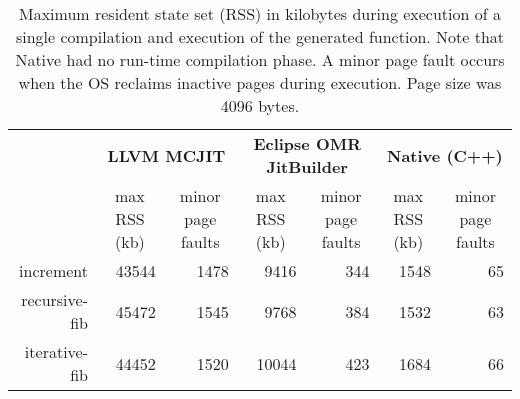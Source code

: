 \begin{table*}[t]
  \begin{tabular}{|r|l|l|l|l|l|l|}
  \hline
  
  \multicolumn{1}{|l|}{\multirow{2}{*}{}} 
  & \multicolumn{2}{c|}{\textbf{LLVM MCJIT}}                                                                                    
  & \multicolumn{2}{c|}{\textbf{Eclipse OMR JitBuilder}}                                                                
  & \multicolumn{2}{c|}{\textbf{Native (C++)}}                                                                              
  \\ \cline{2-7}
  
  \multicolumn{1}{|c|}{\textbf{Program}}  
  & \multicolumn{1}{c|}{max RSS (kb)}  %
  & \multicolumn{1}{c|}{minor page faults}  
  & \multicolumn{1}{c|}{max RSS (kb)}  %
  & \multicolumn{1}{c|}{minor page faults}  
  & \multicolumn{1}{c|}{max RSS (kb)}  %
  & \multicolumn{1}{c|}{minor page faults}  
  \\ \hline

  increment                               
  & \multicolumn{1}{r|}{\num{43544}} %
  & \multicolumn{1}{r|}{\num{1478}} 
  & \multicolumn{1}{r|}{\num{9416}} %
  & \multicolumn{1}{r|}{\num{344}}
  & \multicolumn{1}{r|}{\num{1548}}    %
  & \multicolumn{1}{r|}{\num{65}}
  \\ \hline
  
  recursive-fib                           
  & \multicolumn{1}{r|}{\num{45472}} %
  & \multicolumn{1}{r|}{\num{1545}} 
  & \multicolumn{1}{r|}{\num{9768}} %
  & \multicolumn{1}{r|}{\num{384}} 
  & \multicolumn{1}{r|}{\num{1532}}   %
  & \multicolumn{1}{r|}{\num{63}} 
  \\ \hline
  
  iterative-fib                           
  & \multicolumn{1}{r|}{\num{44452}} %
  & \multicolumn{1}{r|}{\num{1520}}
  & \multicolumn{1}{r|}{\num{10044}} %
  & \multicolumn{1}{r|}{\num{423}}
  & \multicolumn{1}{r|}{\num{1684}}   %
  & \multicolumn{1}{r|}{\num{66}}  
  \\ \hline
  
\end{tabular}
  \caption{Maximum resident state set (RSS) in kilobytes during execution of a single compilation and execution of the generated function. Note that Native had no run-time compilation phase. A minor page fault occurs when the OS reclaims inactive pages during execution. Page size was 4096 bytes.}
  \label{tab:max_rss}
\end{table*}

